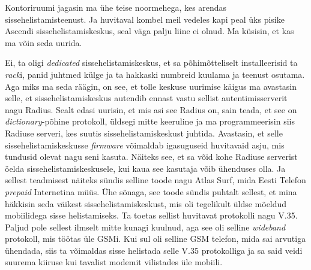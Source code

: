 Kontoriruumi jagasin ma ühe teise noormehega, kes arendas 
sissehelistamisteenust. Ja  huvitaval kombel meil vedeles kapi peal üks pisike 
Ascendi sissehelistamiskeskus, seal väga palju liine ei olnud. Ma küsisin, et 
kas ma võin seda uurida.


Ei, ta oligi \emph{dedicated} sissehelistamiskeskus, et sa põhimõtteliselt 
installeerisid ta \emph{rack}i, panid  juhtmed külge ja ta hakkaski numbreid 
kuulama ja teenust osutama. Aga miks ma seda räägin, on see, et tolle keskuse 
uurimise käigus ma avastasin selle, et  sissehelistamiskeskus autendib ennast  
vastu sellist autentimisserverit nagu Radius. Sealt edasi uurisin, et mis asi 
see Radius on, sain teada, et see on \emph{dictionary}-põhine protokoll, 
üldsegi mitte keeruline ja ma programmeerisin siis Radiuse serveri, kes  suutis 
sissehelistamiskeskust juhtida. Avastasin, et selle sissehelistamiskeskusse 
\emph{firmware} võimaldab igasuguseid huvitavaid asju, mis tundusid olevat nagu 
seni kasuta. Näiteks see, et sa võid kohe Radiuse serverist öelda 
sissehelistamiskeskusele, kui kaua see kasutaja võib ühenduses olla. Ja sellest 
teadmisest näiteks sündis selline toode nagu Atlas Surf, mida 
Eesti Telefon \emph{prepaid} Internetina  müüs. Ühe sõnaga, see toode sündis 
puhtalt sellest, et mina häkkisin  seda väikest sissehelistamiskeskust, mis oli 
tegelikult üldse mõeldud  mobiilidega sisse helistamiseks. Ta toetas sellist 
huvitavat protokolli nagu V.35. Paljud pole sellest ilmselt mitte kunagi 
kuulnud, aga see oli selline \emph{wideband} protokoll, mis töötas üle GSMi. 
Kui sul oli selline GSM telefon, mida sai arvutiga ühendada, siis ta võimaldas 
sisse helistada selle V.35 protokolliga ja sa said veidi suurema kiiruse kui 
tavalist modemit vilistades üle  mobiili. 


